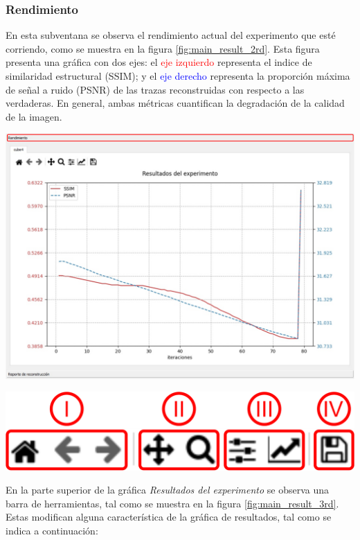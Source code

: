 \documentclass[12pt,twoside,letter]{ol-softwaremanual}
\newenvironment{Figure}
  {\par\medskip\noindent\minipage{\linewidth}}
  {\endminipage\par\medskip}
\begin{document}
\subsubsection*{Rendimiento}

En esta subventana se observa el rendimiento actual del experimento que esté corriendo, como se muestra en la figura \ref{fig:main_result_2rd}. Esta figura presenta una gráfica con dos ejes: el \textcolor{red}{eje izquierdo} representa el indice de similaridad estructural (SSIM); y el \textcolor{blue}{eje derecho} representa la proporción máxima de señal a ruido (PSNR) de las trazas reconstruidas con respecto a las verdaderas. En general, ambas métricas cuantifican la degradación de la calidad de la imagen.

\begin{Figure}
	\centering
	\includegraphics[width=0.8\linewidth]{rendrd.pdf}
	\label{fig:main_result_2rd}
\end{Figure}

\begin{multicols}{2}
	
	\begin{Figure}
		\vspace{0.7cm}
		\centering
		\includegraphics[width=0.9\linewidth]{main-result-3.png}
		\label{fig:main_result_3rd}
	\end{Figure}
	
	En la parte superior de la gráfica \textit{Resultados del experimento} se observa una barra de herramientas, tal como se muestra en la figura \ref{fig:main_result_3rd}. Estas modifican alguna característica de la gráfica de resultados, tal como se indica a continuación:
	
\end{multicols}
\end{document}
